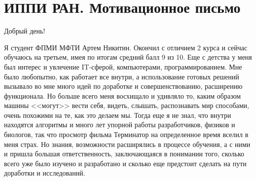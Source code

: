 \section{\textbf{ИППИ РАН. Мотивационное письмо}}
\smallskip

\quad Добрый день!
\smallskip

\quad Я студент ФПМИ МФТИ Артем Никитин. Окончил с отличием 2 курса и сейчас обучаюсь на третьем, имея по итогам средний балл 9 из 10. Еще с
детства у меня был интерес и увлечение IT-сферой, компьютерами, программированием. Мне было любопытно, как работает все внутри, а использование
готовых решений вызывало во мне много идей по доработке и совершенствованию, расширению функционала. Но больше всего меня восхищало и удивляло
то, каким образом машины <<могут>> вести себя, видеть, слышать, распознавать мир способами, очень похожими на те, как это делаем мы. Тогда еще
я не знал, что внутри находятся алгоритмы и много лет упорной работы разработчиков, физиков и биологов, так что просмотр фильма Терминатор на
определенное время вселил в меня страх. Но знания, возможности расширялись в процессе обучения, а с ними и пришла большая ответственность,
заключающаяся в понимании того, сколько всего уже было изучено и разработано и сколько еще предстоит сделать на пути доработки и исследований.

